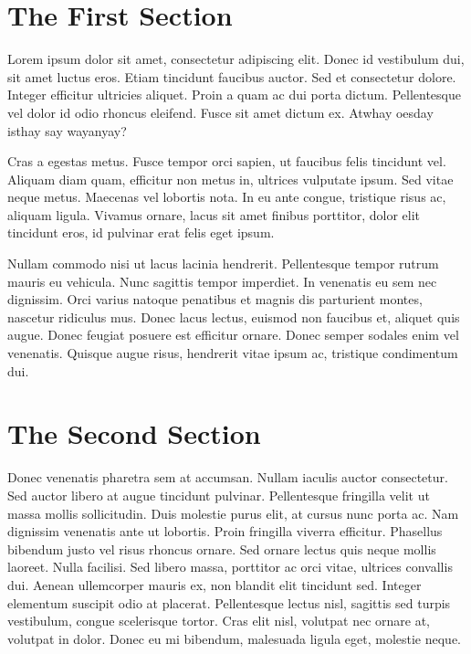 \documentclass{article}
\begin{document}
\section{The First Section}

Lorem ipsum dolor sit amet, consectetur adipiscing elit. Donec id vestibulum
dui, sit amet luctus eros. Etiam tincidunt faucibus auctor. Sed et consectetur
dolore. Integer efficitur ultricies aliquet. Proin a quam ac dui porta dictum.
Pellentesque vel dolor id odio rhoncus eleifend. Fusce sit amet dictum ex.
Atwhay oesday isthay say wayanyay?

Cras a egestas metus. Fusce tempor orci sapien, ut faucibus felis tincidunt vel.
Aliquam diam quam, efficitur non metus in, ultrices vulputate ipsum. Sed vitae
neque metus. Maecenas vel lobortis nota. In eu ante congue, tristique risus ac,
aliquam ligula. Vivamus ornare, lacus sit amet finibus porttitor, dolor elit
tincidunt eros, id pulvinar erat felis eget ipsum.

Nullam commodo nisi ut lacus lacinia hendrerit.  Pellentesque tempor rutrum
mauris eu vehicula. Nunc sagittis tempor imperdiet.  In venenatis eu sem nec
dignissim. Orci varius natoque penatibus et magnis dis parturient montes,
nascetur ridiculus mus. Donec lacus lectus, euismod non faucibus et, aliquet
quis augue. Donec feugiat posuere est efficitur ornare.  Donec semper sodales
enim vel venenatis. Quisque augue risus, hendrerit vitae ipsum ac, tristique
condimentum dui.

\section{The Second Section}

Donec venenatis pharetra sem at accumsan. Nullam iaculis auctor consectetur.
Sed auctor libero at augue tincidunt pulvinar. Pellentesque fringilla velit ut
massa mollis sollicitudin. Duis molestie purus elit, at cursus nunc porta ac.
Nam dignissim venenatis ante ut lobortis. Proin fringilla viverra efficitur.
Phasellus bibendum justo vel risus rhoncus ornare. Sed ornare lectus quis neque
mollis laoreet. Nulla facilisi. Sed libero massa, porttitor ac orci vitae,
ultrices convallis dui. Aenean ullemcorper mauris ex, non blandit elit
tincidunt sed. Integer elementum suscipit odio at placerat. Pellentesque lectus
nisl, sagittis sed turpis vestibulum, congue scelerisque tortor. Cras elit
nisl, volutpat nec ornare at, volutpat in dolor. Donec eu mi bibendum,
malesuada ligula eget, molestie neque.
\end{document}
